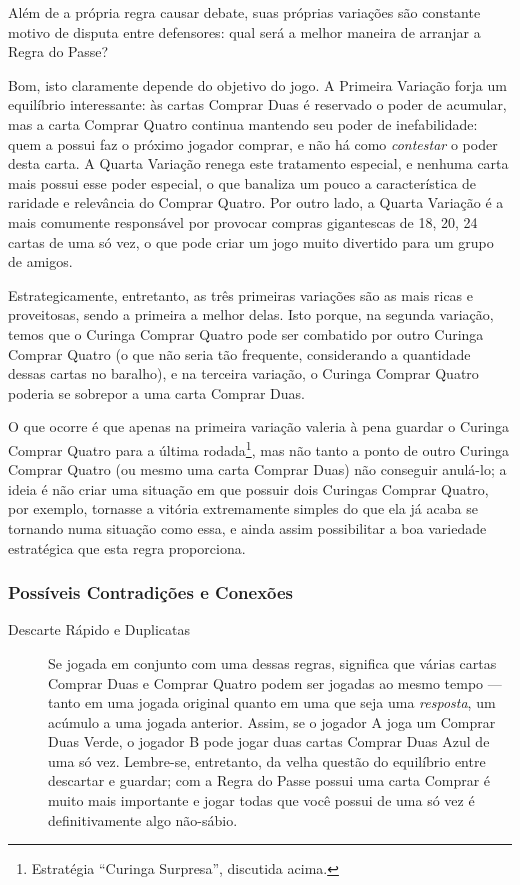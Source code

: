Além de a própria regra causar debate, suas próprias variações são constante motivo de disputa entre defensores: qual será a melhor maneira de arranjar a Regra do Passe?

Bom, isto claramente depende do objetivo do jogo. A Primeira Variação forja um equilíbrio interessante: às cartas Comprar Duas é reservado o poder de acumular, mas a carta Comprar Quatro continua mantendo seu poder de inefabilidade: quem a possui faz o próximo jogador comprar, e não há como \emph{contestar} o poder desta carta. A Quarta Variação renega este tratamento especial, e nenhuma carta mais possui esse poder especial, o que banaliza um pouco a característica de raridade e relevância do Comprar Quatro. Por outro lado, a Quarta Variação é a mais comumente responsável por provocar compras gigantescas de 18, 20, 24 cartas de uma só vez, o que pode criar um jogo muito divertido para um grupo de amigos.

Estrategicamente, entretanto, as três primeiras variações são as mais ricas e proveitosas, sendo a primeira a melhor delas. Isto porque, na segunda variação, temos que o Curinga Comprar Quatro pode ser combatido por outro Curinga Comprar Quatro (o que não seria tão frequente, considerando a quantidade dessas cartas no baralho), e na terceira variação, o Curinga Comprar Quatro poderia se sobrepor a uma carta Comprar Duas.

O que ocorre é que apenas na primeira variação valeria à pena guardar o Curinga Comprar Quatro para a última rodada\footnote{Estratégia ``Curinga Surpresa'', discutida acima.}, mas não tanto a ponto de outro Curinga Comprar Quatro (ou mesmo uma carta Comprar Duas) não conseguir anulá-lo; a ideia é não criar uma situação em que possuir dois Curingas Comprar Quatro, por exemplo, tornasse a vitória extremamente simples do que ela já acaba se tornando numa situação como essa, e ainda assim possibilitar a boa variedade estratégica que esta regra proporciona.

\subsubsection{Possíveis Contradições e Conexões}

\begin{description}
\item[Descarte Rápido e Duplicatas]{Se jogada em conjunto com uma dessas regras, significa que várias cartas Comprar Duas e Comprar Quatro podem ser jogadas ao mesmo tempo --- tanto em uma jogada original quanto em uma que seja uma \emph{resposta}, um acúmulo a uma jogada anterior. Assim, se o jogador A joga um Comprar Duas Verde, o jogador B pode jogar duas cartas Comprar Duas Azul de uma só vez. Lembre-se, entretanto, da velha questão do equilíbrio entre descartar e guardar; com a Regra do Passe possui uma carta Comprar é muito mais importante e jogar todas que você possui de uma só vez é definitivamente algo não-sábio.}
\end{description}

